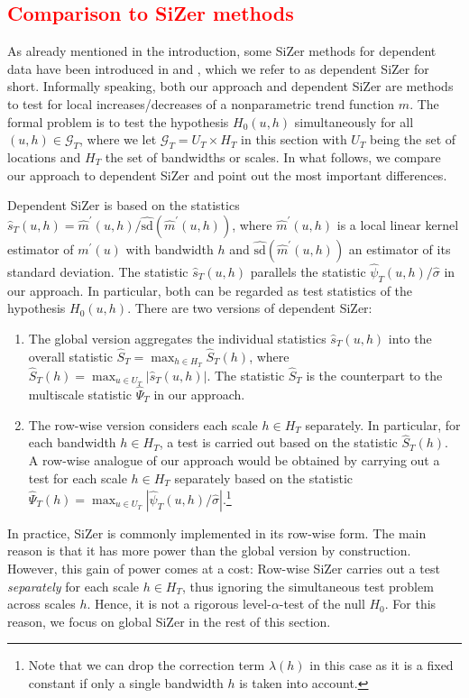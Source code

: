 \subsection{\textcolor{red}{Comparison to SiZer methods}}\label{subsec-method-comparison} 


As already mentioned in the introduction, some SiZer methods for dependent data have been introduced in \cite{Rondonotti2004} and \cite{Rondonotti2007}, which we refer to as dependent SiZer for short. Informally speaking, both our approach and dependent SiZer are methods to test for local increases/decreases of a nonparametric trend function $m$. The formal problem is to test the hypothesis $H_0(u,h)$ simultaneously for all $(u,h) \in \mathcal{G}_T$, where we let $\mathcal{G}_T = U_T \times H_T$ in this section with $U_T$ being the set of locations and $H_T$ the set of bandwidths or scales. In what follows, we compare our approach to dependent SiZer and point out the most important differences. 


Dependent SiZer is based on the statistics $\widehat{s}_T(u,h) = \widehat{m}^\prime(u,h)/\widehat{\text{sd}}(\widehat{m}^\prime(u,h))$, where $\widehat{m}^\prime(u,h)$ is a local linear kernel estimator of $m^\prime(u)$ with bandwidth $h$ and $\widehat{\text{sd}}(\widehat{m}^\prime(u,h))$ an estimator of its standard deviation. The statistic $\widehat{s}_T(u,h)$ parallels the statistic $\widehat{\psi}_T(u,h)/\widehat{\sigma}$ in our approach. In particular, both can be regarded as test statistics of the hypothesis $H_0(u,h)$. There are two versions of dependent SiZer: 
\begin{enumerate}[label=(\alph*), leftmargin=0.75cm]

\item The global version aggregates the individual statistics $\widehat{s}_T(u,h)$ into the overall statistic $\widehat{S}_T = \max_{h \in H_T} \widehat{S}_T(h)$, where $\widehat{S}_T(h) = \max_{u \in U_T} |\widehat{s}_T(u,h)|$. The statistic $\widehat{S}_T$ is the counterpart to the multiscale statistic $\widehat{\Psi}_T$ in our approach. 

\item The row-wise version considers each scale $h \in H_T$ separately. In particular, for each bandwidth $h \in H_T$, a test is carried out based on the statistic $\widehat{S}_T(h)$. A row-wise analogue of our approach would be obtained by carrying out a test for each scale $h \in H_T$ separately based on the statistic $\widehat{\Psi}_T(h) = \max_{u \in U_T} |\widehat{\psi}_T(u,h)/\widehat{\sigma}|$.\footnote{Note that we can drop the correction term $\lambda(h)$ in this case as it is a fixed constant if only a single bandwidth $h$ is taken into account.}

\end{enumerate}
In practice, SiZer is commonly implemented in its row-wise form. The main reason is that it has more power than the global version by construction. However, this gain of power comes at a cost: Row-wise SiZer carries out a test \textit{separately} for each scale $h \in H_T$, thus ignoring the simultaneous test problem across scales $h$. Hence, it is not a rigorous level-$\alpha$-test of the null $H_0$. For this reason, we focus on global SiZer in the rest of this section. 


